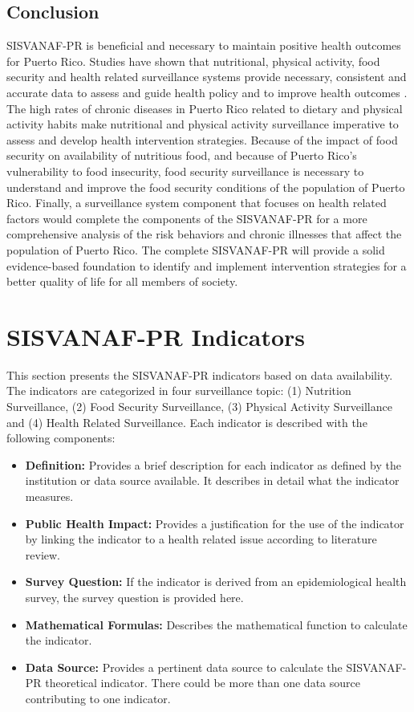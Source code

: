 \documentclass[12pt,letterpaper]{report}
\begin{document}
\subsection{Conclusion}
SISVANAF-PR is beneficial and necessary to maintain positive health outcomes for Puerto Rico. Studies have shown that nutritional, physical activity, food security and health related surveillance systems provide necessary, consistent and accurate data to assess and guide health policy and to improve health outcomes \cite{german2001updated}. The high rates of chronic diseases in Puerto Rico related to dietary and physical activity habits make nutritional and physical activity surveillance imperative to assess and develop health intervention strategies. Because of the impact of food security on availability of nutritious food, and because of Puerto Rico's vulnerability to food insecurity, food security surveillance is necessary to understand and improve the food security conditions of the population of Puerto Rico. Finally, a surveillance system component that focuses on health related factors would complete the components of the SISVANAF-PR for a more comprehensive analysis of the risk behaviors and chronic illnesses that affect the population of Puerto Rico. The complete SISVANAF-PR will provide a solid evidence-based foundation to identify and implement intervention strategies for a better quality of life for all members of society. 

\newpage
\section{SISVANAF-PR Indicators}

This section presents the SISVANAF-PR indicators based on data availability. The indicators are categorized in four surveillance topic: (1) Nutrition Surveillance, (2) Food Security Surveillance, (3) Physical Activity Surveillance and (4) Health Related Surveillance. Each indicator is described with the following components:

\begin{itemize}
\item\textbf{Definition:} Provides a brief description for each indicator as defined by the institution or data source available. It describes in detail what the indicator measures.
\item\textbf{Public Health Impact:} Provides a justification for the use of the indicator by linking the indicator to a health related issue according to literature review.
\item\textbf{Survey Question:} If the indicator is derived from an epidemiological health survey, the survey question is provided here.
\item\textbf{Mathematical Formulas:} Describes the mathematical function to calculate the indicator.
\item\textbf{Data Source:} Provides a pertinent data source to calculate the SISVANAF-PR theoretical indicator. There could be more than one data source contributing to one indicator.
\end{itemize}
\end{document}
